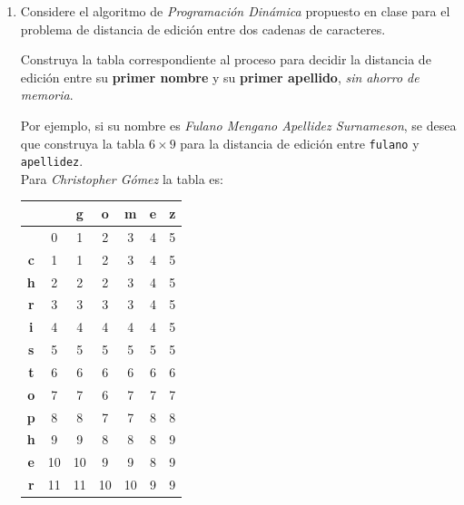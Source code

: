 \documentclass[letterpaper, 12pt]{article}
\begin{document}
\begin{enumerate}


\item Considere el algoritmo de \emph{Programación Dinámica} propuesto en clase para el problema de distancia de edición entre dos cadenas de caracteres.

Construya la tabla correspondiente al proceso para decidir la distancia de edición entre su \textbf{primer nombre} y su \textbf{primer apellido}, \emph{sin ahorro de memoria}.

Por ejemplo, si su nombre es \emph{Fulano Mengano Apellidez Surnameson}, se desea que construya
la tabla $6 \times 9$ para la distancia de edición entre \texttt{fulano} y \texttt{apellidez}. \\

Para \emph{Christopher Gómez} la tabla es:

\begin{center}
    \begin{tabular}{|c|c|c|c|c|c|c|}
        \hline
        & & \textbf{g} & \textbf{o} & \textbf{m} & \textbf{e} & \textbf{z} \\ \hline
        & 0 \cellcolor[HTML]{B2DAFA}
        & 1 & 2 & 3 & 4 & 5 \\ \hline
        \textbf{c} & 1 \cellcolor[HTML]{B2DAFA} & 1 & 2 & 3 & 4 & 5 \\ \hline
        \textbf{h} & 2 \cellcolor[HTML]{B2DAFA} & 2 & 2 & 3 & 4 & 5 \\ \hline
        \textbf{r} & 3 \cellcolor[HTML]{B2DAFA} & 3 & 3 & 3 & 4 & 5 \\ \hline
        \textbf{i} & 4 \cellcolor[HTML]{B2DAFA} & 4 & 4 & 4 & 4 & 5 \\ \hline
        \textbf{s} & 5 \cellcolor[HTML]{B2DAFA} & 5 & 5 & 5 & 5 & 5 \\ \hline
        \textbf{t} & 6 & 6 \cellcolor[HTML]{B2DAFA}& 6 & 6 & 6 & 6 \\ \hline
        \textbf{o} & 7 & 7 & 6 \cellcolor[HTML]{B2DAFA} & 7 & 7 & 7 \\ \hline
        \textbf{p} & 8 & 8 & 7 \cellcolor[HTML]{B2DAFA} & 7 & 8 & 8 \\ \hline
        \textbf{h} & 9 & 9 & 8 & 8 \cellcolor[HTML]{B2DAFA} & 8 & 9 \\ \hline
        \textbf{e} & 10 & 10 & 9 & 9 & 8 \cellcolor[HTML]{B2DAFA} & 9 \\ \hline
        \textbf{r} & 11 & 11 & 10 & 10 & 9 & 9 \cellcolor[HTML]{B2DAFA} \\ \hline
    \end{tabular}
\end{center}


\end{enumerate}
\end{document}
